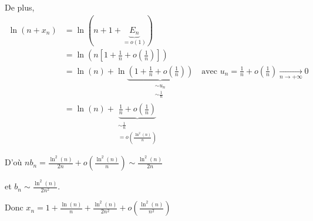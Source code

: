 \begin{solution}
De plus, 
\begin{align*}
\ln(n + x_n) &= \ln\left(n + 1 + \underbrace{E_n}_{= o(1)}\right) \\
&= \ln\left( n \left[ 1 + \frac{1}{n} + o\left(\frac{1}{n}\right) \right] \right) \\
&= \ln(n) + \ln\underbrace{\left( 1 + \frac{1}{n} + o\left(\frac{1}{n}\right) \right)}_{\substack{\sim u_n \\ \sim \frac{1}{n}}} \quad \text{avec } u_n = \frac{1}{n} + o\left(\frac{1}{n}\right) \xrightarrow[n \to +\infty]{} 0 \\
&= \ln(n) + \underbrace{\frac{1}{n} + o\left(\frac{1}{n}\right)}_{\substack{\sim \frac{1}{n} \\ = o\left(\frac{\ln^2(n)}{n}\right)}}
\end{align*}

D'où $n b_n = \frac{\ln^2(n)}{2n} + o\left(\frac{\ln^2(n)}{n}\right) \sim \frac{\ln^2(n)}{2n}$

et $b_n \sim \frac{\ln^2(n)}{2n^2}$.

Donc $\boxed{x_n = 1 + \frac{\ln(n)}{n} + \frac{\ln^2(n)}{2n^2} + o\left(\frac{\ln^2(n)}{n^2}\right)}$
\end{solution}
